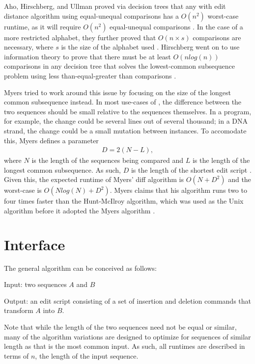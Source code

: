 \documentclass[11pt,letterpaper]{article}
\begin{document}
Aho, Hirschberg, and Ullman proved via decision trees that any with edit distance algorithm using equal-unequal comparisons has a $O(n^2)$ worst-case runtime, as it will require $O(n^2)$ equal-unequal comparisons \citep{aho}. In the case of a more restricted alphabet, they further proved that $O(n\times s)$ comparisons are necessary, where $s$ is the size of the alphabet used \citep{aho}. Hirschberg went on to use information theory to prove that there must be at least $O(n log(n))$ comparisons in any decision tree that solves the lowest-common subsequence problem using less than-equal-greater than comparisons \citep{hirschberg77}.

Myers tried to work around this issue by focusing on the size of the longest common subsequence instead. In most use-cases of \diff, the difference between the two sequences should be small relative to the sequences themselves. In a program, for example, the change could be several lines out of several thousand; in a DNA strand, the change could be a small mutation between instances. To accomodate this, Myers defines a parameter 
\begin{align*}
D = 2(N - L),
\end{align*}
where $N$ is the length of the sequences being compared and $L$ is the length of the longest common subsequence. As such, $D$ is the length of the shortest edit script \citep{myers}. Given this, the expected runtime of Myers' diff algorithm is $O(N + D^2)$ and the worst-case is $O(N log(N) + D^2)$. Myers claims that his algorithm runs two to four times faster than the Hunt-McIlroy algorithm, which was used as the Unix \diff algorithm before it adopted the Myers algorithm \citep{hunt}. 


\section{Interface}

The general \diff algorithm can be conceived as follows:

Input: two sequences $A$ and $B$

Output: an edit script consisting of a set of insertion and deletion commands that transform $A$ into $B$. 


Note that while the length of the two sequences need not be equal or similar, many of the \diff algorithm variations are designed to optimize for sequences of similar length as that is the most common input. As such, all runtimes are described in terms of $n$, the length of the input sequence.
\end{document}
